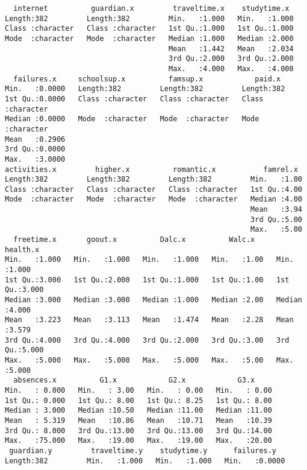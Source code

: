 \documentclass[12pt]{abntex2}
\begin{document}
\begin{verbatim}
  internet          guardian.x         traveltime.x    studytime.x   
Length:382         Length:382         Min.   :1.000   Min.   :1.000  
Class :character   Class :character   1st Qu.:1.000   1st Qu.:1.000  
Mode  :character   Mode  :character   Median :1.000   Median :2.000  
                                      Mean   :1.442   Mean   :2.034  
                                      3rd Qu.:2.000   3rd Qu.:2.000  
                                      Max.   :4.000   Max.   :4.000  
  failures.x     schoolsup.x          famsup.x            paid.x         
Min.   :0.0000   Length:382         Length:382         Length:382        
1st Qu.:0.0000   Class :character   Class :character   Class :character  
Median :0.0000   Mode  :character   Mode  :character   Mode  :character  
Mean   :0.2906                                                           
3rd Qu.:0.0000                                                           
Max.   :3.0000                                                           
activities.x         higher.x          romantic.x           famrel.x   
Length:382         Length:382         Length:382         Min.   :1.00  
Class :character   Class :character   Class :character   1st Qu.:4.00  
Mode  :character   Mode  :character   Mode  :character   Median :4.00  
                                                         Mean   :3.94  
                                                         3rd Qu.:5.00  
                                                         Max.   :5.00  
  freetime.x       goout.x          Dalc.x          Walc.x        health.x    
Min.   :1.000   Min.   :1.000   Min.   :1.000   Min.   :1.00   Min.   :1.000  
1st Qu.:3.000   1st Qu.:2.000   1st Qu.:1.000   1st Qu.:1.00   1st Qu.:3.000  
Median :3.000   Median :3.000   Median :1.000   Median :2.00   Median :4.000  
Mean   :3.223   Mean   :3.113   Mean   :1.474   Mean   :2.28   Mean   :3.579  
3rd Qu.:4.000   3rd Qu.:4.000   3rd Qu.:2.000   3rd Qu.:3.00   3rd Qu.:5.000  
Max.   :5.000   Max.   :5.000   Max.   :5.000   Max.   :5.00   Max.   :5.000  
  absences.x          G1.x            G2.x            G3.x      
Min.   : 0.000   Min.   : 3.00   Min.   : 0.00   Min.   : 0.00  
1st Qu.: 0.000   1st Qu.: 8.00   1st Qu.: 8.25   1st Qu.: 8.00  
Median : 3.000   Median :10.50   Median :11.00   Median :11.00  
Mean   : 5.319   Mean   :10.86   Mean   :10.71   Mean   :10.39  
3rd Qu.: 8.000   3rd Qu.:13.00   3rd Qu.:13.00   3rd Qu.:14.00  
Max.   :75.000   Max.   :19.00   Max.   :19.00   Max.   :20.00  
 guardian.y         traveltime.y    studytime.y      failures.y    
Length:382         Min.   :1.000   Min.   :1.000   Min.   :0.0000  

\end{verbatim}
\end{document}
